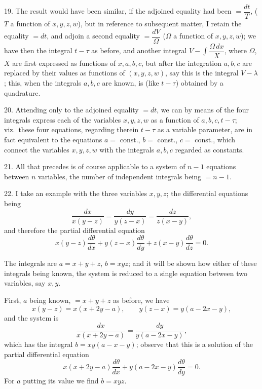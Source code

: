 \documentclass[11pt,a4paper]{article}
\begin{document}
\newpage


19. The result would have been similar, if the adjoined equality had been $= \dfrac{dt}{T}$, ($T$ a function of $x, y, z, w$), but in reference to subsequent matter, I retain the equality $= dt$, and adjoin a second equality $= \dfrac{dV}{\Omega}$ ($\Omega$ a function of $x, y, z, w$); we have then the integral $t - \tau$ as before, and another integral $V - \displaystyle\int \dfrac{\Omega\, dx}{X}$, where $\Omega$, $X$ are first expressed as functions of $x, a, b, c$, but after the integration $a, b, c$ are replaced by their values as functions of $(x, y, z, w)$, say this is the integral $V - \lambda$; this, when the integrals $a, b, c$ are known, is (like $t - \tau$) obtained by a quadrature.

20. Attending only to the adjoined equality $= dt$, we can by means of the four integrals express each of the variables $x, y, z, w$ as a function of $a, b, c, t - \tau$; viz.\ these four equations, regarding therein $t - \tau$ as a variable parameter, are in fact equivalent to the equations $a = $ const., $b = $ const., $c = $ const., which connect the variables $x, y, z, w$ with the integrals $a, b, c$ regarded as constants.

21. All that precedes is of course applicable to a system of $n - 1$ equations between $n$ variables, the number of independent integrals being $= n - 1$.

22. I take an example with the three variables $x, y, z$; the differential equations being
\[
\frac{dx}{x(y - z)} = \frac{dy}{y(z - x)} = \frac{dz}{z(x - y)},
\]
and therefore the partial differential equation
\[
x(y - z)\frac{d\theta}{dx} + y(z - x)\frac{d\theta}{dy} + z(x - y)\frac{d\theta}{dz} = 0.
\]

The integrals are $a = x + y + z$, $b = xyz$; and it will be shown how either of these integrals being known, the system is reduced to a single equation between two variables, say $x, y$.

First, $a$ being known, $= x + y + z$ as before, we have
\[
x(y - z) = x(x + 2y - a), \qquad y(z - x) = y(a - 2x - y),
\]
and the system is
\[
\frac{dx}{x(x + 2y - a)} = \frac{dy}{y(a - 2x - y)},
\]
which has the integral $b = xy(a - x - y)$; observe that this is a solution of the partial differential equation
\[
x(x + 2y - a)\frac{d\theta}{dx} + y(a - 2x - y)\frac{d\theta}{dy} = 0.
\]
For $a$ putting its value we find $b = xyz$.

\newpage
\end{document}
